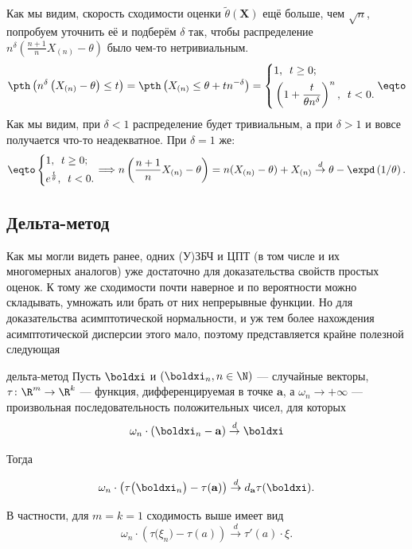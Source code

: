 \begin{example}
    Как мы видим, скорость сходимости оценки $\widetilde{\theta}(\mathbf X)$ ещё больше, чем $\sqrt{n}$, попробуем уточнить её и подберём $\delta$ так, чтобы распределение $n^{\delta}(\frac{n+1}{n} X_{(n)} - \theta)$ было чем-то нетривиальным.
    \begin{gather*}
        \pth\left(n^{\delta}\left(X_{(n)} - \theta\right) \le t\right) = \pth\left(X_{(n)} \le \theta + t n^{-\delta}\right) = 
        \left\{
        \begin{aligned}
        &1,\,\,\,t \ge 0;\\
        &\left(1 + \frac{t}{\theta n^{\delta}}\right)^n,\,\,\,t < 0.
        \end{aligned}
        \right. \eqto
    \end{gather*}
    Как мы видим, при $\delta < 1$ распределение будет тривиальным, а при $\delta > 1$ и вовсе получается что-то неадекватное. При $\delta = 1$ же:
    \[
    \eqto \left\{
        \begin{aligned}
        &1,\,\,\,t \ge 0;\\
        &e^{\frac{t}{\theta}},\,\,\,t < 0.
        \end{aligned}
        \right. \Longrightarrow n\left(\frac{n+1}{n} X_{(n)} - \theta\right) = n(X_{(n)} - \theta) + X_{(n)} \stackrel{d}{\to} \theta - \expd\left(1/\theta\right).
    \]
\end{example}

\subsection{Дельта-метод}

Как мы могли видеть ранее, одних (У)ЗБЧ и ЦПТ (в том числе и их многомерных аналогов) уже достаточно для доказательства свойств простых оценок. К тому же сходимости почти наверное и по вероятности можно складывать, умножать или брать от них непрерывные функции. Но для доказательства асимптотической нормальности, и уж тем более нахождения асимптотической дисперсии этого мало, поэтому представляется крайне полезной следующая

\begin{theorem}[label=delta_method]{дельта-метод}{}
	Пусть $\boldxi$ и $(\boldxi_n, n \in \N)$ --- случайные векторы, $\tau \colon \R^m \to \R^k$ --- функция, дифференцируемая в точке $\mathbf{a}$, а $\omega_n\to +\infty$ --- произвольная последовательность положительных чисел, для которых
	\begin{equation}\label{delta_method_premise}
		\omega_n \cdot \left(\boldxi_n - \mathbf{a}\right) \stackrel{d}{\to} \boldxi
	\end{equation}
	
	Тогда

	\[
	\omega_n\cdot\left(\tau\bigl(\boldxi_n\bigr) - \tau(\mathbf{a})\right) \stackrel{d}{\to} d_{\mathbf{a}}\tau(\boldxi).
	\]

    В частности, для $m = k = 1$ сходимость выше имеет вид
    \[
    \omega_n\cdot\left(\tau\bigl(\xi_n\bigr) - \tau(a)\right) \stackrel{d}{\to} \tau'(a) \cdot \xi.
    \]
\end{theorem}

